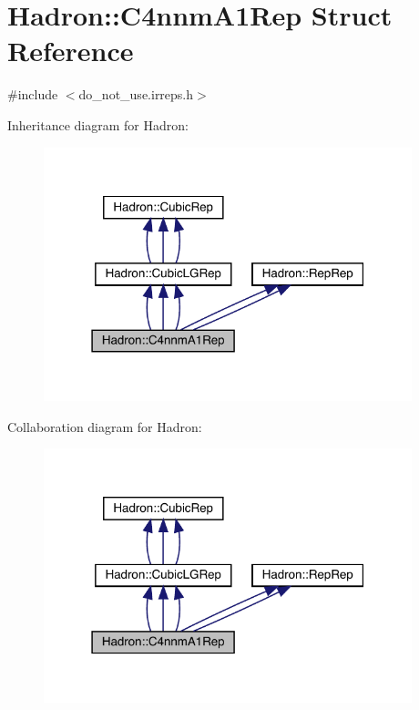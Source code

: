 \hypertarget{structHadron_1_1C4nnmA1Rep}{}\section{Hadron\+:\+:C4nnm\+A1\+Rep Struct Reference}
\label{structHadron_1_1C4nnmA1Rep}


{\ttfamily \#include $<$do\+\_\+not\+\_\+use.\+irreps.\+h$>$}



Inheritance diagram for Hadron\+:
\nopagebreak
\begin{figure}[H]
\begin{center}
\leavevmode
\includegraphics[width=303pt]{d3/d7d/structHadron_1_1C4nnmA1Rep__inherit__graph}
\end{center}
\end{figure}


Collaboration diagram for Hadron\+:
\nopagebreak
\begin{figure}[H]
\begin{center}
\leavevmode
\includegraphics[width=303pt]{d3/d05/structHadron_1_1C4nnmA1Rep__coll__graph}
\end{center}
\end{figure}
